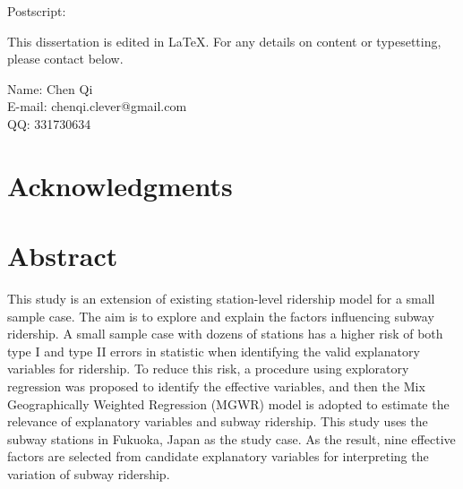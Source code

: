 \documentclass[12pt, twoside, a4paper]{book} %
\renewcommand{\baselinestretch}{1.5} %
\begin{document}
Postscript:

This dissertation is edited in \LaTeX. For any details on content or typesetting, please contact below.

\begin{flushright}
Name: Chen Qi \\
E-mail: chenqi.clever@gmail.com \\
QQ: 331730634 \\
\end{flushright}


\renewcommand{\baselinestretch}{1.2} %
\fontsize{14pt}{14pt} %
\selectfont
\tableofcontents %
\listoffigures %
\listoftables %

\frontmatter
\renewcommand{\baselinestretch}{1.8} %
\fontsize{13pt}{13pt} %
\selectfont

\chapter{Acknowledgments}

\chapter{Abstract}

This study is an extension of existing station-level ridership model for a small sample case. The aim is to explore and explain the factors influencing subway ridership. A small sample case with dozens of stations has a higher risk of both type I and type II errors in statistic when identifying the valid explanatory variables for ridership. To reduce this risk, a procedure using exploratory regression was proposed to identify the effective variables, and then the Mix Geographically Weighted Regression (MGWR) model is adopted to estimate the relevance of explanatory variables and subway ridership. This study uses the subway stations in Fukuoka, Japan as the study case. As the result, nine effective factors are selected from candidate explanatory variables for interpreting the variation of subway ridership.
\end{document}
